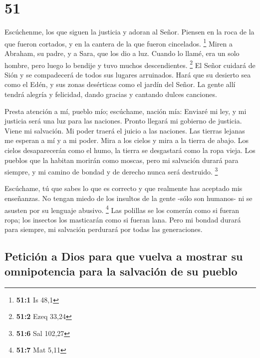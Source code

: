 \hypertarget{section-50}{%
\section{51}\label{section-50}}

 Escúchenme, los que siguen la justicia y adoran al Señor.
Piensen en la roca de la que fueron cortados, y en la cantera de la que
fueron cincelados. \footnote{\textbf{51:1} Is 48,1}  Miren
a Abraham, su padre, y a Sara, que los dio a luz. Cuando lo llamé, era
un solo hombre, pero luego lo bendije y tuvo muchos descendientes.
\footnote{\textbf{51:2} Ezeq 33,24}  El Señor cuidará de
Sión y se compadecerá de todos sus lugares arruinados. Hará que su
desierto sea como el Edén, y sus zonas desérticas como el jardín del
Señor. La gente allí tendrá alegría y felicidad, dando gracias y
cantando dulces canciones.

 Presta atención a mí, pueblo mío; escúchame, nación mía:
Enviaré mi ley, y mi justicia será una luz para las naciones.
 Pronto llegará mi gobierno de justicia. Viene mi
salvación. Mi poder traerá el juicio a las naciones. Las tierras lejanas
me esperan a mí y a mi poder.  Mira a los cielos y mira a
la tierra de abajo. Los cielos desaparecerán como el humo, la tierra se
desgastará como la ropa vieja. Los pueblos que la habitan morirán como
moscas, pero mi salvación durará para siempre, y mi camino de bondad y
de derecho nunca será destruido. \footnote{\textbf{51:6} Sal 102,27}

 Escúchame, tú que sabes lo que es correcto y que
realmente has aceptado mis enseñanzas. No tengan miedo de los insultos
de la gente -sólo son humanos- ni se asusten por su lenguaje abusivo.
\footnote{\textbf{51:7} Mat 5,11}  Las polillas se los
comerán como si fueran ropa; los insectos los masticarán como si fueran
lana. Pero mi bondad durará para siempre, mi salvación perdurará por
todas las generaciones.

\hypertarget{peticiuxf3n-a-dios-para-que-vuelva-a-mostrar-su-omnipotencia-para-la-salvaciuxf3n-de-su-pueblo}{%
\subsection{Petición a Dios para que vuelva a mostrar su omnipotencia
para la salvación de su
pueblo}\label{peticiuxf3n-a-dios-para-que-vuelva-a-mostrar-su-omnipotencia-para-la-salvaciuxf3n-de-su-pueblo}}

